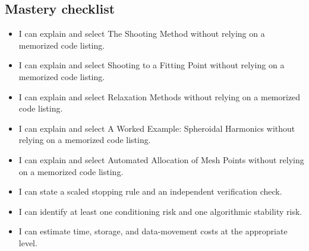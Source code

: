 \documentclass[10pt,letterpaper]{article}
\begin{document}
\subsection*{Mastery checklist}
\begin{itemize}
\item[$\square$] I can explain and select The Shooting Method without relying on a memorized code listing.
\item[$\square$] I can explain and select Shooting to a Fitting Point without relying on a memorized code listing.
\item[$\square$] I can explain and select Relaxation Methods without relying on a memorized code listing.
\item[$\square$] I can explain and select A Worked Example: Spheroidal Harmonics without relying on a memorized code listing.
\item[$\square$] I can explain and select Automated Allocation of Mesh Points without relying on a memorized code listing.
\item[$\square$] I can state a scaled stopping rule and an independent verification check.
\item[$\square$] I can identify at least one conditioning risk and one algorithmic stability risk.
\item[$\square$] I can estimate time, storage, and data-movement costs at the appropriate level.
\end{itemize}
\end{document}
